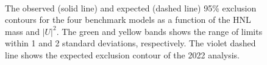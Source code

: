 \begin{figure}[!htbp]
    \centering
    \\
    \caption{The observed (solid line) and expected (dashed line) 95\% exclusion contours for the four benchmark models as a function of the HNL mass and $|U|^2$. The green and yellow bands shows the range of limits within 1 and 2 standard deviations, respectively. The violet dashed line shows the expected exclusion contour of the 2022 analysis.}
    \label{fig:limits}
\end{figure}

